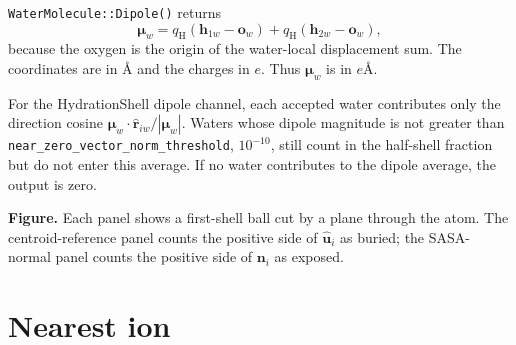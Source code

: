 \documentclass[11pt]{article}
\newcommand{\code}[1]{\texttt{#1}}
\begin{document}
\code{WaterMolecule::Dipole()} returns
\[
  \bm\mu_w =
  q_{\mathrm H}(\bm h_{1w}-\bm o_w)
  +q_{\mathrm H}(\bm h_{2w}-\bm o_w),
\]
because the oxygen is the origin of the water-local displacement sum. The
coordinates are in \(\si{\angstrom}\) and the charges in
\(\si{\elementarycharge}\). Thus \(\bm\mu_w\) is in
\(\si{\elementarycharge\angstrom}\).

For the HydrationShell dipole channel, each accepted water contributes only the
direction cosine
\(\bm\mu_w\cdot\hat{\bm r}_{iw}/|\bm\mu_w|\). Waters whose dipole magnitude is
not greater than \code{near\_zero\_vector\_norm\_threshold},
\(10^{-10}\), still count in the half-shell fraction but do not enter this
average.
If no water contributes to the dipole average, the output is zero.

\begin{center}
\centering
{}

\smallskip
{\small\textbf{Figure.} Each panel shows a first-shell ball cut by a plane
through the atom.
The centroid-reference panel counts the positive side of \(\hat{\bm u}_i\) as
buried; the SASA-normal panel counts the positive side of \(\bm n_i\) as
exposed.}
\end{center}

\section{Nearest ion}
\end{document}

